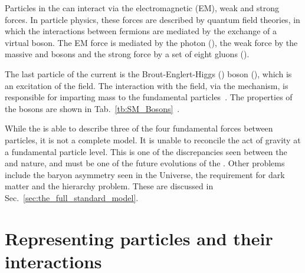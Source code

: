 Particles in the \SM{} can interact via the electromagnetic (EM), weak and strong forces. 
In particle physics, these forces are described by quantum field theories, in which the interactions between fermions are mediated by the exchange of a virtual boson.
The EM force is mediated by the photon (\photon{}), the weak force by the massive \Wboson{} and \Zboson{} bosons and the strong force by a set of eight gluons (\gluon{}). 

The last particle of the current \SM{} is the Brout-Englert-Higgs (\BEH) boson (\Hboson), which is an excitation of the \BEH{} field.
The interaction with the \BEH{} field, via the \BEH{} mechanism, is responsible for imparting mass to the fundamental particles~\cite{Th:Higgs1, Th:Higgs2, Th:Higgs3}. 
The properties of the bosons are shown in Tab.~\ref{tb:SM_Bosons}~\cite{PDG}.


While the \SM{} is able to describe three of the four fundamental forces between particles, it is not a complete model.
It is unable to reconcile the act of gravity at a fundamental particle level.
This is one of the discrepancies seen between the \SM{} and nature, and must be one of the future evolutions of the \SM{}.
Other problems include the baryon asymmetry seen in the Universe, the requirement for dark matter and the hierarchy problem.
These are discussed in Sec.~\ref{sec:the_full_standard_model}.

\section{Representing particles and their interactions}
\label{sec:FD}

